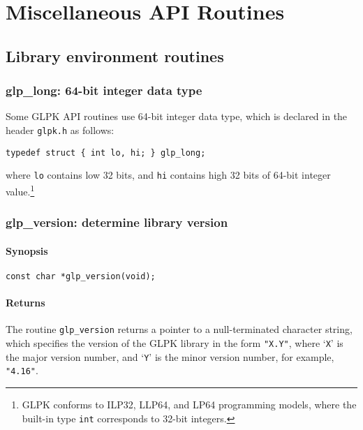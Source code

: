 
\chapter{Miscellaneous API Routines}

\section{Library environment routines}

\subsection{glp\_long: 64-bit integer data type}

Some GLPK API routines use 64-bit integer data type, which is declared
in the header \verb|glpk.h| as follows:

\begin{verbatim}
typedef struct { int lo, hi; } glp_long;
\end{verbatim}

\noindent
where \verb|lo| contains low 32 bits, and \verb|hi| contains high 32
bits of 64-bit integer value.\footnote{GLPK conforms to ILP32, LLP64,
and LP64 programming models, where the built-in type {\tt int}
corresponds to 32-bit integers.}

\subsection{glp\_version: determine library version}

\subsubsection*{Synopsis}

\begin{verbatim}
const char *glp_version(void);
\end{verbatim}

\subsubsection*{Returns}

The routine \verb|glp_version| returns a pointer to a null-terminated
character string, which specifies the version of the GLPK library in
the form \verb|"X.Y"|, where `\verb|X|' is the major version number, and
`\verb|Y|' is the minor version number, for example, \verb|"4.16"|.

